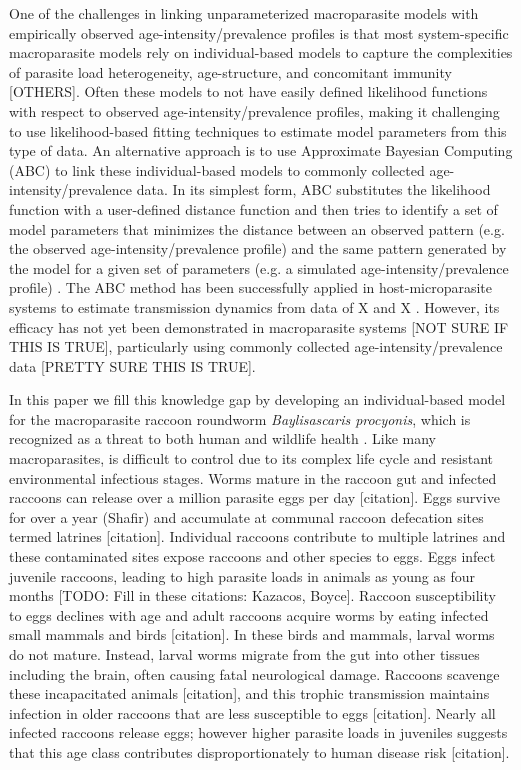 \documentclass[11pt]{article}
\begin{document}
One of the challenges in linking unparameterized macroparasite models with empirically observed age-intensity/prevalence profiles is that most system-specific macroparasite models rely on individual-based models to capture the complexities of parasite load heterogeneity, age-structure, and concomitant immunity \citep[e.g.][]{Cornell2005,Drawert2017,McCallum2017} [OTHERS].  Often these models to not have easily defined likelihood functions with respect to observed age-intensity/prevalence profiles, making it challenging to use likelihood-based fitting techniques to estimate model parameters from this type of data. An alternative approach is to use Approximate Bayesian Computing (ABC) \citep{Beaumont2010} to link these individual-based models to commonly collected age-intensity/prevalence data.  In its simplest form, ABC substitutes the likelihood function with a user-defined distance function and then tries to identify a set of model parameters that minimizes the distance between an observed pattern (e.g. the observed age-intensity/prevalence profile) and the same pattern generated by the model for a given set of parameters (e.g. a simulated age-intensity/prevalence profile) \citep{Toni2009,Beaumont2010}.  The ABC method has been successfully applied in host-microparasite systems to estimate transmission dynamics from data of X and X \citep{Conlan2012,Kosmala2015}. However, its efficacy has not yet been demonstrated in macroparasite systems [NOT SURE IF THIS IS TRUE], particularly using commonly collected age-intensity/prevalence data [PRETTY SURE THIS IS TRUE]. 

In this paper we fill this knowledge gap by developing an individual-based model for the macroparasite raccoon roundworm \emph{Baylisascaris procyonis}, which is recognized as a threat to both human and wildlife health \citep{Page2011,Weinstein2017}. Like many
macroparasites, is difficult to control due to its complex life cycle
and resistant environmental infectious stages. Worms mature in the
raccoon gut and infected raccoons can release over a million parasite
eggs per day [citation]. Eggs survive for over a year (Shafir) and accumulate at
communal raccoon defecation sites termed latrines [citation]. Individual
raccoons contribute to multiple latrines and these contaminated sites
expose raccoons and other species to eggs. Eggs infect juvenile
raccoons, leading to high parasite loads in animals as young as four
months \citep{Weinstein2016} [TODO: Fill in these citations: Kazacos, Boyce]. Raccoon susceptibility to eggs
declines with age and adult raccoons acquire worms by eating infected
small mammals and birds [citation]. In these birds and mammals, larval worms do
not mature. Instead, larval worms migrate from the gut into other
tissues including the brain, often causing fatal neurological damage.
Raccoons scavenge these incapacitated animals [citation], and this trophic
transmission maintains infection in older raccoons that are less
susceptible to eggs [citation]. Nearly all infected raccoons release eggs;
however higher parasite loads in juveniles suggests that this age class
contributes disproportionately to human disease risk [citation].
\end{document}
